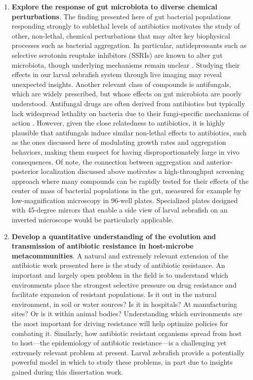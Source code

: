 \begin{enumerate}
\item 
\textbf{Explore the response of gut microbiota to diverse chemical perturbations}. The finding presented here of gut bacterial populations responding strongly to sublethal levels of antibiotics motivates the study of other, non-lethal, chemical perturbations that may alter key biophysical processes such as bacterial aggregation. In particular, antidepressants such as selective serotonin reuptake inhibitors (SSRIs) are known to alter gut microbiota, though underlying mechanisms remain unclear \cite{lukic2019antidepressants}. Studying their effects in our larval zebrafish system through live imaging may reveal unexpected insights. Another relevant class of compounds is antifungals, which are widely prescribed, but whose effects on gut microbiota are poorly understood. Antifungal drugs are often derived from antibiotics but typically lack widespread lethality on bacteria due to their fungi-specific mechanisms of action \cite{ghannoum1999antifungal}. However, given the close relatedness to antibiotics, it is highly plausible that antifungals induce similar non-lethal effects to antibiotics, such as the ones discussed here of modulating growth rates and aggregation behaviors, making them suspect for having disproportionately large in vivo consequences. Of note, the connection between aggregation and anterior-posterior localization discussed above motivates a high-throughput screening approach where many compounds can be rapidly tested for their effects of the center of mass of bacterial populations in the gut, measured for example by low-magnification microscopy in 96-well plates. Specialized plates designed with 45-degree mirrors that enable a side view of larval zebrafish on an inverted microscope would be particularly applicable.

\item 
\textbf{Develop a quantitative understanding of the evolution and transmission of antibiotic resistance in host-microbe metacommunities}. A natural and extremely relevant extension of the antibiotic work presented here is the study of antibiotic resistance. An important and largely open problem in the field is to understand which environments place the strongest selective pressure on drug resistance and facilitate expansion of resistant populations. Is it out in the natural environment, in soil or water sources? Is it in hospitals? At manufacturing sites? Or is it within animal bodies? Understanding which environments are the most important for driving resistance will help optimize policies for combating it. Similarly, how antibiotic resistant organisms spread from host to host---the epidemiology of antibiotic resistance---is a challenging yet extremely relevant problem at present. Larval zebrafish provide a potentially powerful model in which to study these problems, in part due to insights gained during this dissertation work. 


\end{enumerate}
